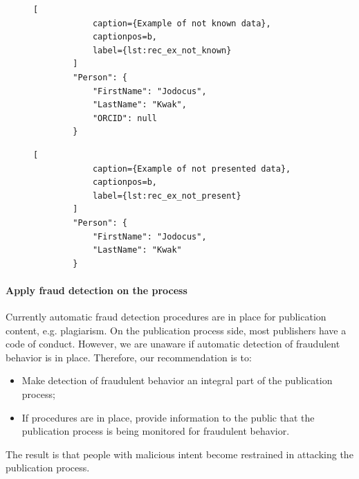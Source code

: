 \documentclass{ou-report}
\begin{document}
\begin{figure}[!h]
    \begin{minipage}{0.5\textwidth}
        \begin{lstlisting}[
            caption={Example of not known data},
            captionpos=b,
            label={lst:rec_ex_not_known}
        ]
        "Person": {
            "FirstName": "Jodocus",
            "LastName": "Kwak",
            "ORCID": null
        }
        \end{lstlisting}
    \end{minipage}
    \begin{minipage}{0.5\textwidth}
        \vspace{15pt}
        \begin{lstlisting}[
            caption={Example of not presented data},
            captionpos=b,
            label={lst:rec_ex_not_present}
        ]
        "Person": {
            "FirstName": "Jodocus",
            "LastName": "Kwak"
        }
        \end{lstlisting}
    \end{minipage}
\end{figure}


\paragraph{Apply fraud detection on the process}
Currently automatic fraud detection procedures are in place for publication 
content, e.g. plagiarism. On the publication process side, most publishers have 
a code of conduct. However, we are unaware if automatic detection of fraudulent 
behavior is in place.
Therefore, our recommendation is to:
\begin{itemize}
    \item Make detection of fraudulent behavior an integral part of the 
        publication process;
    \item If procedures are in place, provide information to the public that the 
        publication process is being monitored for fraudulent behavior.
\end{itemize}
The result is that people with malicious intent become restrained in attacking
the publication process.

\end{document}
